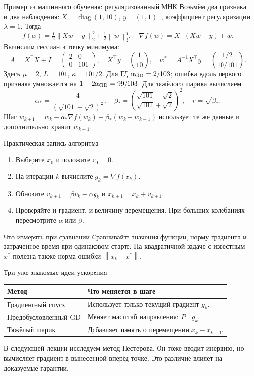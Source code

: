 \documentclass[aspectratio=169,10pt]{beamer}
\newcommand{\norm}[1]{\left\lVert #1\right\rVert}
\newcommand{\grad}{\nabla}
\begin{document}
\begin{frame}{Пример из машинного обучения: регуляризованный МНК}
\small
Возьмём два признака и два наблюдения:
$X=\operatorname{diag}(1,10)$, $y=(1,1)^\top$, коэффициент регуляризации $\lambda=1$.
Тогда
\[
f(w)=\tfrac12\norm{Xw-y}_2^2+\tfrac12\norm w_2^2,
\quad
\grad f(w)=X^\top(Xw-y)+w.
\]
Вычислим гессиан и точку минимума:
\[
A=X^\top X+I=\begin{pmatrix}2&0\\0&101\end{pmatrix},\quad
X^\top y=\binom1{10},\quad
w^*=A^{-1}X^\top y=\binom{1/2}{10/101}.
\]
Здесь $\mu=2$, $L=101$, $\kappa=101/2$. Для ГД
$\alpha_{\rm GD}=2/103$; ошибка вдоль первого признака умножается на
$1-2\alpha_{\rm GD}=99/103$.
Для тяжёлого шарика вычисляем
\[
\alpha_*=\frac4{(\sqrt{101}+\sqrt2)^2},\quad
\beta_*=\left(\frac{\sqrt{101}-\sqrt2}{\sqrt{101}+\sqrt2}\right)^2,
\quad r=\sqrt{\beta_*}.
\]
Шаг $w_{k+1}=w_k-\alpha_*\grad f(w_k)+\beta_*(w_k-w_{k-1})$ использует те же данные и дополнительно хранит $w_{k-1}$.
\end{frame}

\begin{frame}{Практическая запись алгоритма}
\small
\begin{enumerate}
\item Выберите $x_0$ и положите $v_0=0$.
\item На итерации $k$ вычислите $g_k=\grad f(x_k)$.
\item Обновите $v_{k+1}=\beta v_k-\alpha g_k$ и $x_{k+1}=x_k+v_{k+1}$.
\item Проверяйте и градиент, и величину перемещения. При больших колебаниях пересмотрите $\alpha$ или $\beta$.
\end{enumerate}
\begin{block}{Что измерять при сравнении}
Сравнивайте значения функции, норму градиента и затраченное время при одинаковом старте. На квадратичной задаче с известным $x^*$ полезна также норма ошибки $\norm{x_k-x^*}$.
\end{block}
\end{frame}

\begin{frame}{Три уже знакомые идеи ускорения}
\small
\begin{tabular}{@{}p{.25\linewidth}p{.62\linewidth}@{}}
\toprule
Метод & Что меняется в шаге\\
\midrule
Градиентный спуск & Использует только текущий градиент $g_k$.\\[1mm]
Предобусловленный GD & Меняет масштаб направления: $P^{-1}g_k$.\\[1mm]
Тяжёлый шарик & Добавляет память о перемещении $x_k-x_{k-1}$.\\
\bottomrule
\end{tabular}
\par\vspace{3mm}
В следующей лекции исследуем метод Нестерова. Он тоже вводит инерцию, но вычисляет градиент в вынесенной вперёд точке. Это различие влияет на доказуемые гарантии.
\end{frame}
\end{document}

